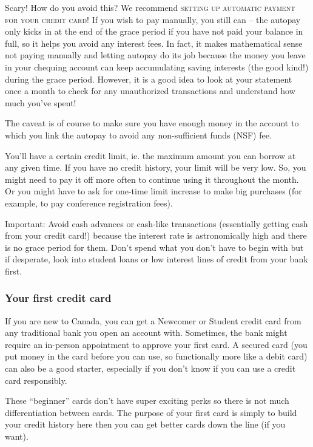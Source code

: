 Scary! How do you avoid this? We recommend \textsc{\color{ocre} setting up automatic payment for your credit card}! If you wish to pay manually, you still can -- the autopay only kicks in at the end of the grace period if you have not paid your balance in full, so it helps you avoid any interest fees. In fact, it makes mathematical sense not paying manually and letting autopay do its job because the money you leave in your chequing account can keep accumulating saving interests (the good kind!) during the grace period. However, it is a good idea to look at your statement once a month to check for any unauthorized transactions and understand how much you've spent!

The caveat is of course to make sure you have enough money in the account to which you link the autopay to avoid any non-sufficient funds (NSF) fee.

You'll have a certain credit limit, ie. the maximum amount you can borrow at any given time. If you have no credit history, your limit will be very low. So, you might need to pay it off more often to continue using it throughout the month. Or you might have to ask for one-time limit increase to make big purchases (for example, to pay conference registration fees). 

{\color{ocre}Important}: Avoid cash advances or cash-like transactions (essentially getting cash from your credit card!) because the interest rate is astronomically high and there is no grace period for them. Don't spend what you don't have to begin with but if desperate, look into student loans or low interest lines of credit from your bank first. 

\subsubsection{Your first credit card}
If you are new to Canada, you can get a Newcomer or Student credit card from any traditional bank you open an account with. Sometimes, the bank might require an in-person appointment to approve your first card. A secured card (you put money in the card before you can use, so functionally more like a debit card) can also be a good starter, especially if you don't know if you can use a credit card responsibly.

These “beginner” cards don't have super exciting perks so there is not much differentiation between cards. The purpose of your first card is simply to build your credit history here then you can get better cards down the line (if you want).

